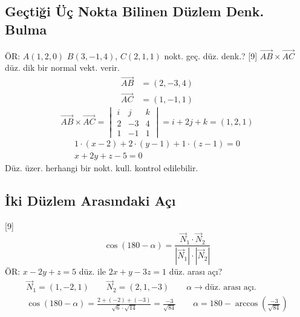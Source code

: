 \documentclass[11pt,a4paper]{article}
\begin{document}
\subsection{Geçtiği Üç Nokta Bilinen Düzlem Denk. Bulma}
ÖR: $A(1,2,0)$ \quad $B(3,-1,4)$, \quad $C(2,1,1)$ nokt. geç. düz. denk.?
[9]
$\overrightarrow{AB}\times\overrightarrow{AC}$ düz. dik bir normal vekt. verir.
\begin{align*}
\overrightarrow{AB}&=(2,-3,4)\\
\overrightarrow{AC}&=(1,-1,1)
\end{align*}
\[ \overrightarrow{AB}\times\overrightarrow{AC}=\begin{vmatrix}i&j&k\\2&-3&4\\1&-1&1\end{vmatrix}=i+2j+k=(1,2,1) \]
\begin{gather*}
1\cdot(x-2)+2\cdot(y-1)+1\cdot(z-1)=0\\
x+2y+z-5=0
\end{gather*}
Düz. üzer. herhangi bir nokt. kull. kontrol edilebilir.

\subsection{İki Düzlem Arasındaki Açı}
[9]
\[ \cos(180-\alpha)=\frac{\vec N_1\cdot\vec N_2}{|\vec N_1|\cdot|\vec N_2|} \]
ÖR: $x-2y+z=5$ düz. ile $2x+y-3z=1$ düz. arası açı?
\begin{gather*}
\vec N_1=(1,-2,1)\qquad \vec N_2=(2,1,-3)\qquad \alpha\to\text{düz. arası açı.}\\
\cos(180-\alpha)=\frac{2+(-2)+(-3)}{\sqrt6\cdot\sqrt{14}}=\frac{-3}{\sqrt{84}}\qquad \alpha=180-\arccos\!\left(\frac{-3}{\sqrt{84}}\right)
\end{gather*}
\end{document}
